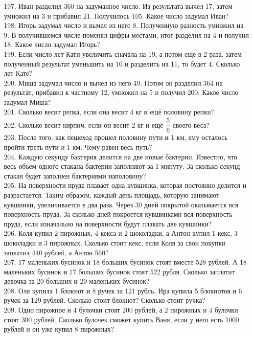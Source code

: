 \documentclass[12pt]{article}
\begin{document}
197. Иван разделил 360 на задуманное число. Из результата вычел 17, затем умножил на 3 и прибавил 21. Получилось 105. Какое число задумал Иван?\\
198. Игорь задумал число и вычел из него 8. Полученную разность умножил на 9. В получившемся числе поменял цифры местами, итог разделил на 4 и получил 18. Какое число задумал Игорь?\\
199.  Если число лет Кати увеличить сначала на 19, а потом ещё в 2 раза, затем полученный результат уменьшить на 10 и разделить на 11, то будет 4. Сколько лет Кате?\\
200. Миша задумал число и вычел из него 49. Потом он разделил 364 на результат, прибавил к частному 12, умножил на 5 и получил 200. Какое число задумал Миша?\\
201. Сколько весит репка, если она весит 4 кг и ещё половину репки?\\
202. Сколько весит кирпич, если он весит 2 кг и ещё $\cfrac{5}{6}$ своего веса?\\
203. После того, как пешеход прошел половину пути и 1 км, ему осталось пройти треть пути и 1 км. Чему равен весь путь?\\
204. Каждую секунду бактерия делится на две новые бактерии. Известно, что весь объём одного стакана бактерии заполняют за 1 минуту. За сколько секунд стакан будет заполнен бактериями наполовину?\\
205. На поверхности пруда плавает одна кувшинка, которая постоянно делится и разрастается. Таким образом, каждый день площадь, которую занимают кувшинки, увеличивается в два раза. Через 30 дней покрытой оказывается вся поверхность пруда. За сколько дней покроется кувшинками вся поверхность пруда, если изначально на поверхности будут плавать две кувшинки?\\
206. Коля купил 2 пирожных, 4 кекса и 2 шоколадки, а Антон купил 1 кекс, 3 шоколадки и 3 пирожных. Сколько стоит кекс, если Коля за свои покупки заплатил 440 рублей, а Антон 560?\\
207. 17 маленьких бусинок и 18 больших бусинок стоят вместе 528 рублей. А 18 маленьких бусинок и 17 больших бусинок стоят 522 рубля. Сколько заплатит девочка за 20 больших и 20 маленьких бусинок?\\
208. Оля купила 1 блокнот и 8 ручек за 121 рубль. Ира купила 5 блокнотов и 6 ручек за 129 рублей. Сколько стоит блокнот? Сколько стоит ручка?\\
209. Одно пирожное и 4 булочки стоят 200 рублей, а 2 пирожных и 4 булочки стоят 300 рублей. Сколько булочек сможет купить Ваня, если у него есть 1000 рублей и он уже купил 8 пирожных?\\
\end{document}
